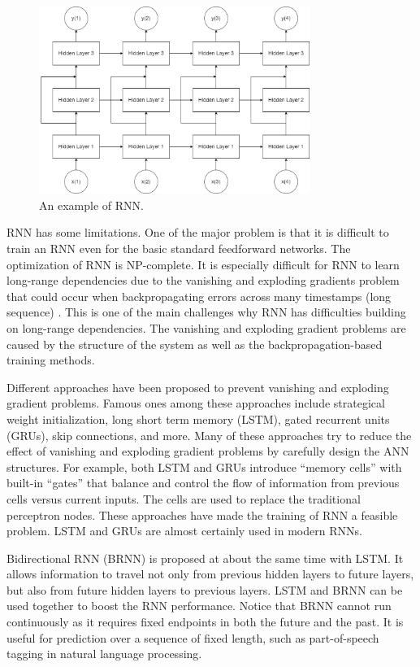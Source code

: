 \begin{figure}
	\centering
	\includegraphics[width=250pt]{chapters/part-3/figures/rnn_general.png}
	\caption{An example of RNN.} \label{ch:rnn:fig:rnn_general}
\end{figure}

RNN has some limitations. One of the major problem is that it is difficult to train an RNN even for the basic standard feedforward networks. The optimization of RNN is NP-complete. It is especially difficult for RNN to learn long-range dependencies due to the vanishing and exploding gradients problem that could occur when backpropagating errors across many timestamps (long sequence) \cite{lipton2015critical}. This is one of the main challenges why RNN has difficulties building on long-range dependencies. The vanishing and exploding gradient problems are caused by the structure of the system as well as the backpropagation-based training methods.

Different approaches have been proposed to prevent vanishing and exploding gradient problems. Famous ones among these approaches include strategical weight initialization, long short term memory (LSTM), gated recurrent units (GRUs), skip connections, and more. Many of these approaches try to reduce the effect of vanishing and exploding gradient problems by carefully design the ANN structures. For example, both LSTM and GRUs introduce ``memory cells'' with built-in ``gates'' that balance and control the flow of information from previous cells versus current inputs. The cells are used to replace the traditional perceptron nodes. These approaches have made the training of RNN a feasible problem. LSTM and GRUs are almost certainly used in modern RNNs.

Bidirectional RNN (BRNN) is proposed at about the same time with LSTM. It allows information to travel not only from previous hidden layers to future layers, but also from future hidden layers to previous layers. LSTM and BRNN can be used together to boost the RNN performance. Notice that BRNN cannot run continuously as it requires fixed endpoints in both the future and the past. It is useful for prediction over a sequence of fixed length, such as part-of-speech tagging in natural language processing.

